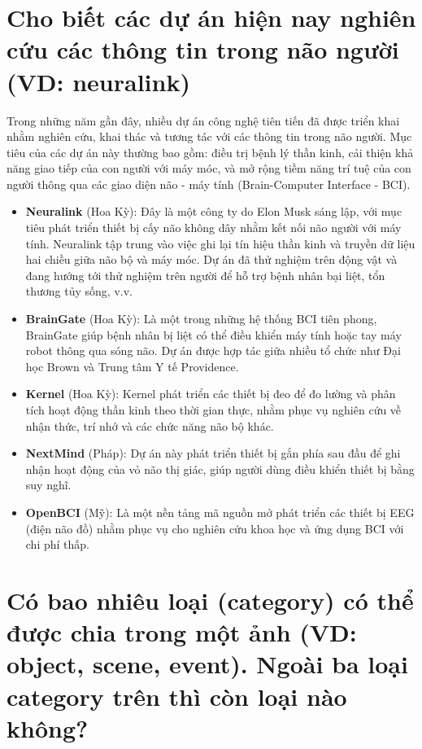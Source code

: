 \documentclass[12pt]{article}
\begin{document}
	\section{Cho biết các dự án hiện nay nghiên cứu các thông tin trong não người (VD: neuralink)}
	
	Trong những năm gần đây, nhiều dự án công nghệ tiên tiến đã được triển khai nhằm nghiên cứu, khai thác và tương tác với các thông tin trong não người. Mục tiêu của các dự án này thường bao gồm: điều trị bệnh lý thần kinh, cải thiện khả năng giao tiếp của con người với máy móc, và mở rộng tiềm năng trí tuệ của con người thông qua các giao diện não - máy tính (Brain-Computer Interface - BCI).
	
	\begin{itemize}
	\item \textbf{Neuralink} (Hoa Kỳ): 
	Đây là một công ty do Elon Musk sáng lập, với mục tiêu phát triển thiết bị cấy não không dây nhằm kết nối não người với máy tính. Neuralink tập trung vào việc ghi lại tín hiệu thần kinh và truyền dữ liệu hai chiều giữa não bộ và máy móc. Dự án đã thử nghiệm trên động vật và đang hướng tới thử nghiệm trên người để hỗ trợ bệnh nhân bại liệt, tổn thương tủy sống, v.v.
	
	\item \textbf{BrainGate} (Hoa Kỳ): 
	Là một trong những hệ thống BCI tiên phong, BrainGate giúp bệnh nhân bị liệt có thể điều khiển máy tính hoặc tay máy robot thông qua sóng não. Dự án được hợp tác giữa nhiều tổ chức như Đại học Brown và Trung tâm Y tế Providence.
	
	\item \textbf{Kernel} (Hoa Kỳ): 
	Kernel phát triển các thiết bị đeo để đo lường và phân tích hoạt động thần kinh theo thời gian thực, nhằm phục vụ nghiên cứu về nhận thức, trí nhớ và các chức năng não bộ khác.
	
	\item \textbf{NextMind} (Pháp): 
	Dự án này phát triển thiết bị gắn phía sau đầu để ghi nhận hoạt động của vỏ não thị giác, giúp người dùng điều khiển thiết bị bằng suy nghĩ.
	
	\item \textbf{OpenBCI} (Mỹ): 
	Là một nền tảng mã nguồn mở phát triển các thiết bị EEG (điện não đồ) nhằm phục vụ cho nghiên cứu khoa học và ứng dụng BCI với chi phí thấp.
	
	\end{itemize}
	
	\section{Có bao nhiêu loại (category) có thể được chia trong một ảnh (VD: object, scene, event). Ngoài ba loại category trên thì còn loại nào không?}
	
\end{document}
